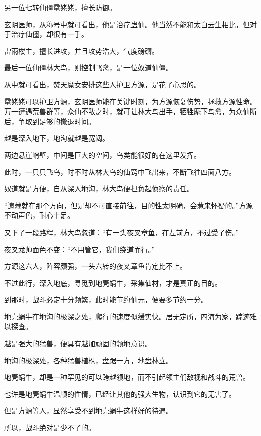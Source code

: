 \begin{this_body}
另一位七转仙僵鼋姥姥，擅长防御。

玄阴医师，从称号中就可看出，他是治疗蛊仙。他当然不能和太白云生相比，但对于治疗仙僵，却很有一手。

雷雨楼主，擅长进攻，并且攻势浩大，气度磅礴。

最后一位仙僵林大鸟，则控制飞禽，是一位奴道仙僵。

从中就可看出，焚天魔女安排这些人护卫方源，是花了心思的。

鼋姥姥可以护卫方源，玄阴医师能在关键时刻，为方源恢复伤势，拯救方源性命。万一遭遇荒兽群等，众仙不敌之时，就可让林大鸟出手，牺牲麾下鸟禽，为众仙断后，争取到足够的撤退时间。

越是深入地下，地沟就越是宽阔。

两边悬崖峭壁，中间是巨大的空间，鸟类能很好的在这里发挥。

此时，一只只飞鸟，时不时从林大鸟的仙窍中飞出来，不断飞往四面八方。

奴道就是方便，自从深入地沟，林大鸟便担负起侦察的责任。

“遗藏就在那个方向，但是却不可直接前往，目的性太明确，会惹来怀疑的。”方源不动声色，耐心十足。

又下了一段路程，林大鸟忽道：“有一头夜叉章鱼，在左前方，不过受了伤。”

夜叉龙帅面色不变：“不用管它，我们绕道而行。”

方源这六人，阵容颇强，一头六转的夜叉章鱼肯定比不上。

不过此行，深入地底，寻觅到地壳蜗牛，采集仙材，才是真正的目的。

到那时，战斗必定十分频繁，此时能节约仙元，便要多节约一分。

地壳蜗牛在地沟的极深之处，爬行的速度似缓实快。居无定所，四海为家，踪迹难以探查。

越是强大的猛兽，便具有越加顽固的领地意识。

地沟的极深处，各种猛兽植株，盘踞一方，地盘林立。

地壳蜗牛，却是一种罕见的可以跨越领地，而不引起领主们敌视和战斗的荒兽。

也许是地壳蜗牛温顺的性情，已经让其他的强大生物，认识到它的无害了。

但是方源等人，显然享受不到地壳蜗牛这样好的待遇。

所以，战斗绝对是少不了的。

\end{this_body}

